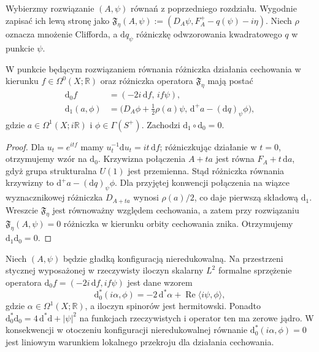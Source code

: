 Wybierzmy rozwiązanie $(A,\psi)$ równań z poprzedniego
rozdziału. Wygodnie zapisać ich lewą stronę jako
$\mathfrak F_\eta(A,\psi):=(D_A\psi,F_A^+-q(\psi)-i\eta)$.
Niech $\rho$ oznacza mnożenie Clifforda, a
$\mathrm dq_\psi$ różniczkę odwzorowania kwadratowego $q$
w punkcie $\psi$.

\begin{stwierdzenie}
\label{prop:tg-sw-linear}
W punkcie będącym rozwiązaniem równania różniczka działania
cechowania w kierunku $f\in\Omega^0(X;\mathbb R)$ oraz
różniczka operatora $\mathfrak F_\eta$ mają postać
\[
\begin{aligned}
\mathrm d_0f&=(-2i\,\mathrm df,\,if\psi),\\
\mathrm d_1(a,\phi)&=\bigl(D_A\phi+\tfrac12\rho(a)\psi,\,
\mathrm d^+a-(\mathrm dq)_\psi\phi\bigr),
\end{aligned}
\]
gdzie $a\in\Omega^1(X;i\mathbb R)$ i $\phi\in\Gamma(S^+)$.
Zachodzi $\mathrm d_1\circ\mathrm d_0=0$.
\end{stwierdzenie}

\begin{proof}
Dla $u_t=e^{itf}$ mamy
$u_t^{-1}\mathrm du_t=it\,\mathrm df$; różniczkując działanie
w $t=0$, otrzymujemy wzór na $\mathrm d_0$.
Krzywizna połączenia $A+ta$ jest równa
$F_A+t\,\mathrm da$, gdyż grupa strukturalna $U(1)$
jest przemienna. Stąd różniczka równania krzywizny
to $\mathrm d^+a-(\mathrm dq)_\psi\phi$.
Dla przyjętej konwencji połączenia na wiązce wyznacznikowej
różniczka $D_{A+ta}$ wynosi $\rho(a)/2$, co daje
pierwszą składową $\mathrm d_1$.
Wreszcie $\mathfrak F_\eta$ jest równoważny względem
cechowania, a zatem przy rozwiązaniu
$\mathfrak F_\eta(A,\psi)=0$ różniczka w kierunku orbity
cechowania znika. Otrzymujemy $\mathrm d_1\mathrm d_0=0$.
\end{proof}

\begin{lemat}
\label{lem:tg-sw-full-coulomb}
Niech $(A,\psi)$ będzie gładką konfiguracją nieredukowalną.
Na przestrzeni stycznej wyposażonej w rzeczywisty iloczyn
skalarny $L^2$ formalne sprzężenie operatora
$\mathrm d_0f=(-2i\,\mathrm df,if\psi)$ jest dane wzorem
\[
\mathrm d_0^*(i\alpha,\phi)
=-2\,\mathrm d^*\alpha
+\operatorname{Re}\langle i\psi,\phi\rangle,
\]
gdzie $\alpha\in\Omega^1(X;\mathbb R)$, a iloczyn
spinorów jest hermitowski. Ponadto
$\mathrm d_0^*\mathrm d_0=4\,\mathrm d^*\mathrm d+|\psi|^2$
na funkcjach rzeczywistych i operator ten ma zerowe jądro.
W konsekwencji w otoczeniu konfiguracji nieredukowalnej
równanie $\mathrm d_0^*(i\alpha,\phi)=0$ jest liniowym
warunkiem lokalnego przekroju dla działania cechowania.
\end{lemat}

